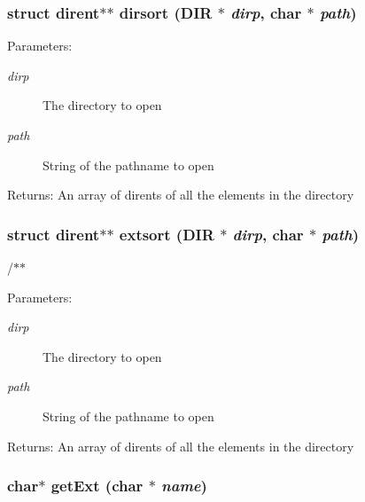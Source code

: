 \subsubsection{\setlength{\rightskip}{0pt plus 5cm}struct dirent$\ast$$\ast$ dirsort (DIR $\ast$ {\em dirp}, char $\ast$ {\em path})}\label{dir_8c_13b4a073dc6dca161b39fdfd42f6a6e2}


\begin{Desc}
\item[Parameters:]
\begin{description}
\item[{\em dirp}]The directory to open \item[{\em path}]String of the pathname to open \end{description}
\end{Desc}
\begin{Desc}
\item[Returns:]An array of dirents of all the elements in the directory \end{Desc}
\subsubsection{\setlength{\rightskip}{0pt plus 5cm}struct dirent$\ast$$\ast$ extsort (DIR $\ast$ {\em dirp}, char $\ast$ {\em path})}\label{dir_8c_14a9483372576e318550bc8c78065a86}


/$\ast$$\ast$ \begin{Desc}
\item[Parameters:]
\begin{description}
\item[{\em dirp}]The directory to open \item[{\em path}]String of the pathname to open \end{description}
\end{Desc}
\begin{Desc}
\item[Returns:]An array of dirents of all the elements in the directory \end{Desc}
\subsubsection{\setlength{\rightskip}{0pt plus 5cm}char$\ast$ get\-Ext (char $\ast$ {\em name})}\label{dir_8c_b5146e12b68e0fa300b937c05e77e0ea}


